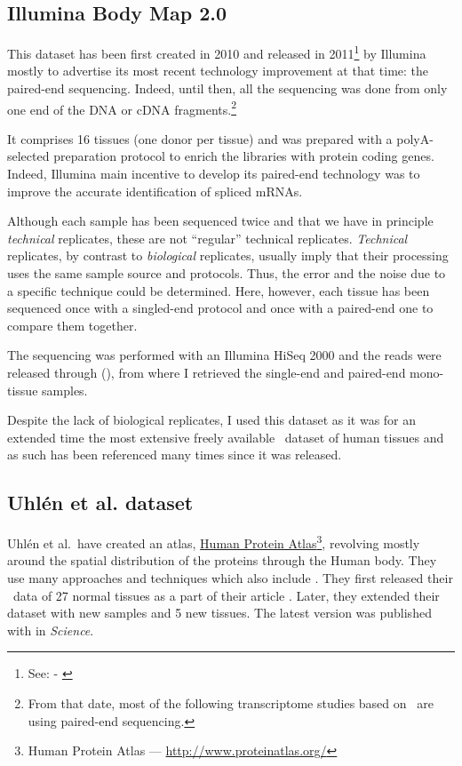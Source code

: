 \subsection{Illumina Body Map 2.0}
This dataset has been first created in 2010 and released in
2011\footnote{See:  - \cite{ibmEnsembl}} by Illumina
mostly to advertise its most recent technology improvement at that time:
the paired-end sequencing. Indeed, until then, all the sequencing was done
from only one end of the \gls{DNA} or \gls{cDNA} fragments.\footnote{From that
date, most of the following transcriptome studies based on \Rnaseq\ are using
paired-end sequencing.}

It comprises 16 tissues (one donor per tissue) and was prepared with a
polyA-selected preparation protocol to enrich the libraries with protein
coding genes. Indeed, Illumina main incentive to develop its paired-end
technology was to improve the accurate identification of spliced \glspl{mRNA}.

Although each sample has been sequenced twice and that we have in principle
\emph{technical} replicates, these are not ``regular'' technical replicates.
\emph{Technical} replicates, by contrast to \emph{biological} replicates,
usually imply that their processing uses the same sample source and protocols.
Thus, the error and the noise due to a specific technique could be determined.
Here, however, each tissue has been sequenced once with a singled-end protocol
and once with a paired-end one to compare them together.

The sequencing was performed with an Illumina HiSeq 2000 and the reads were
released through  (), from where I
retrieved the single-end and paired-end mono-tissue samples.

Despite the lack of biological replicates, I used this dataset as it was for an
extended time the most extensive freely available \Rnaseq\ dataset of human
tissues and as such has been referenced many times since it was released.

\subsection{Uhlén et al. dataset}

Uhlén et al.\ have created an atlas,
\href{http://www.proteinatlas.org/}{Human Protein Atlas}\footnote{%
Human Protein Atlas ---
\href{http://www.proteinatlas.org/}{http://www.proteinatlas.org/}},
revolving mostly around the spatial
distribution of the proteins through the Human body. They use many approaches
and techniques which also include \Rnaseq. They first released their \Rnaseq\
data of 27 normal tissues as a part of their article 
\mycite{Uhlen2014}. Later, they extended their dataset with new samples and 5 new
tissues. The latest version was published with \paper{\citetitle{Uhlen2015}}
\mycite{Uhlen2015} in \textit{Science}.

